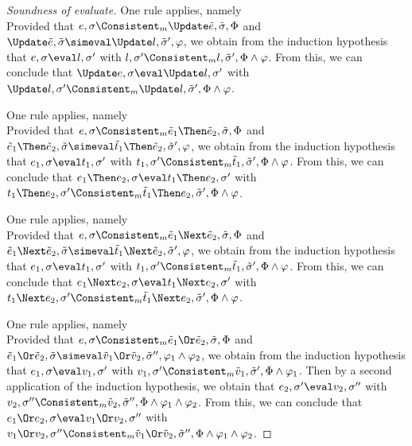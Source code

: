 \begin{proof}[Soundness of evaluate]
    {One rule applies, namely \\
    Provided that $e,\sigma\Consistent_m \Update\tilde{e},\tilde{\sigma},\Phi$ and $\Update\tilde{e},\tilde{\sigma}\simeval\Update l,\tilde{\sigma}',\phi$,
    we obtain from the induction hypothesis that $e,\sigma\eval l,\sigma'$ with $l,\sigma'\Consistent_m l,\tilde{\sigma}',\Phi\land\phi$.
    From this, we can conclude that $\Update e,\sigma\eval \Update l ,\sigma'$ with $\Update l,\sigma'\Consistent_m \Update l,\tilde{\sigma}',\Phi\land\phi$.

    }

    {One rule applies, namely \\
    Provided that $e,\sigma\Consistent_m \tilde{e}_1\Then \tilde{e}_2,\tilde{\sigma},\Phi$ and $\tilde{e}_1\Then \tilde{e}_2,\tilde{\sigma}\simeval\tilde{t}_1\Then \tilde{e}_2,\tilde{\sigma}',\phi$,
    we obtain from the induction hypothesis that $e_1,\sigma\eval t_1,\sigma'$ with $t_1,\sigma'\Consistent_m \tilde{t}_1,\tilde{\sigma}',\Phi\land\phi$.
    From this, we can conclude that $e_1\Then e_2,\sigma\eval t_1\Then e_2,\sigma'$ with $t_1\Then e_2,\sigma'\Consistent_m \tilde{t}_1\Then e_2,\tilde{\sigma}',\Phi\land\phi$.

    }

    {One rule applies, namely \\
    Provided that $e,\sigma\Consistent_m \tilde{e}_1\Next \tilde{e}_2,\tilde{\sigma},\Phi$ and $\tilde{e}_1\Next \tilde{e}_2,\tilde{\sigma}\simeval\tilde{t}_1\Next \tilde{e}_2,\tilde{\sigma}',\phi$,
    we obtain from the induction hypothesis that $e_1,\sigma\eval t_1,\sigma'$ with $t_1,\sigma'\Consistent_m \tilde{t}_1,\tilde{\sigma}',\Phi\land\phi$.
    From this, we can conclude that $e_1\Next e_2,\sigma\eval t_1\Next e_2,\sigma'$ with $t_1\Next e_2,\sigma'\Consistent_m \tilde{t}_1\Next e_2,\tilde{\sigma}',\Phi\land\phi$.

    }

    {One rule applies, namely \\
    Provided that $e,\sigma\Consistent_m\tilde{e}_1 \Or \tilde{e}_2,\tilde{\sigma},\Phi$ and $\tilde{e}_1 \Or \tilde{e}_2,\tilde{\sigma}\simeval\tilde{v}_1\Or \tilde{v}_2,\tilde{\sigma}'',\phi_1\land\phi_2$,
    we obtain from the induction hypothesis that $e_1,\sigma\eval v_1,\sigma'$ with $v_1,\sigma'\Consistent_m\tilde{v}_1,\tilde{\sigma}',\Phi\land\phi_1$.
    Then by a second application of the induction hypothesis, we obtain that $e_2,\sigma'\eval v_2,\sigma''$ with $v_2,\sigma''\Consistent_m\tilde{v}_2,\tilde{\sigma}'',\Phi\land\phi_1\land\phi_2$.
    From this, we can conclude that $e_1 \Or e_2,\sigma\eval v_1 \Or v_2,\sigma''$ with $v_1 \Or v_2,\sigma''\Consistent_m\tilde{v}_1 \Or \tilde{v}_2,\tilde{\sigma}'',\Phi\land\phi_1\land\phi_2$.

}
\end{proof}
